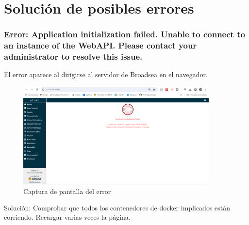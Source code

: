 \section{Solución de posibles errores}

\subsubsection{Error: Application initialization failed. Unable to connect to an instance of the WebAPI. Please contact your administrator to resolve this issue.}

El error aparece al dirigirse al servidor de Broadsea en el navegador.

\begin{figure}[H]
    \centering
    \includegraphics[width=0.90\textwidth]{figures/Error02AppFailed.png}
     \caption{Captura de pantalla del error}
    \label{fig:Error02AppFailed}
\end{figure}

Solución: Comprobar que todos los contenedores de docker implicados están corriendo. Recargar varias veces la página.


